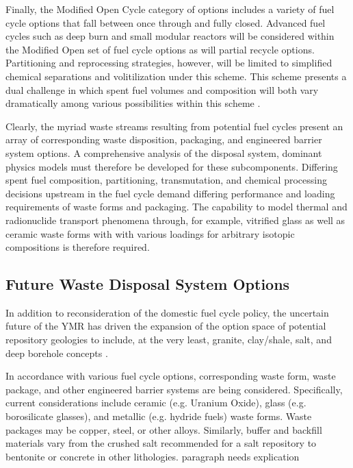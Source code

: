 
Finally, the Modified Open Cycle category of options includes a variety of fuel 
cycle options that fall between once through and fully closed. Advanced fuel 
cycles such as deep burn and small modular reactors will be considered within 
the Modified Open set of fuel cycle options as will partial recycle options.  
Partitioning and reprocessing strategies, however, will be limited to simplified 
chemical separations and volitilization under this scheme. This scheme presents
a dual challenge in which spent fuel volumes and composition will both vary 
dramatically among various possibilities within this scheme 
\cite{doe_nuclear_2010} .


Clearly, the myriad waste streams resulting from potential fuel cycles present 
an array of corresponding waste disposition, packaging, and engineered barrier 
system options. A comprehensive analysis of the disposal system, dominant 
physics models must therefore be developed for these subcomponents.  Differing 
spent fuel composition, partitioning, transmutation, and chemical processing 
decisions upstream in the fuel cycle demand differing performance and loading 
requirements of waste forms and packaging. The capability to model thermal and 
radionuclide transport phenomena through, for example, vitrified glass as well 
as ceramic waste forms with with various loadings for arbitrary isotopic 
compositions is therefore required.  

\subsection{Future Waste Disposal System Options}


In addition to reconsideration of the domestic fuel cycle policy, the uncertain 
future of the \gls{YMR} has driven the expansion of the option space of 
potential repository geologies to include, at the very least, granite, 
clay/shale, salt, and deep borehole concepts \cite{nutt_used_2010}. 


In accordance with various fuel cycle options, corresponding waste form, waste 
package, and other engineered barrier systems are being considered.  
Specifically, current considerations include ceramic (e.g.  Uranium Oxide), 
glass (e.g.  borosilicate glasses), and metallic (e.g.  hydride fuels) waste 
forms. Waste packages may be copper, steel, or other alloys. Similarly, buffer 
and backfill materials vary from the crushed salt recommended for a salt 
repository to bentonite or concrete in other lithologies. %
paragraph needs explication

